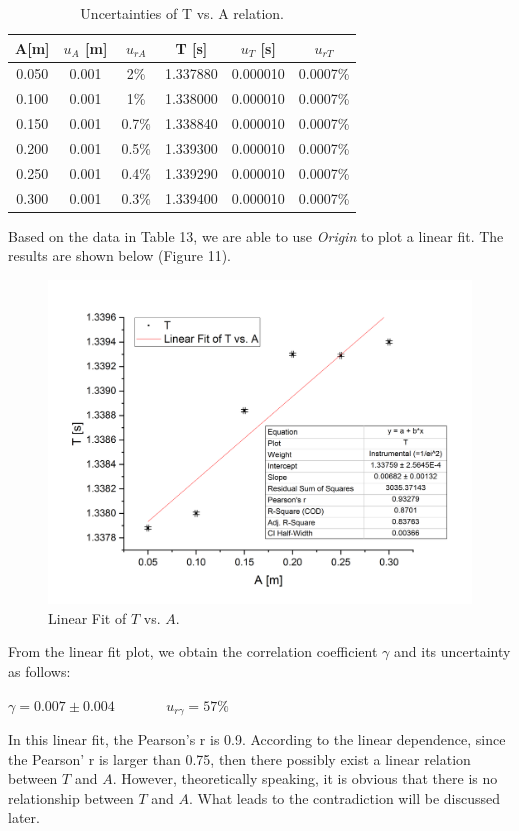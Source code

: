 \documentclass[a4paper,12pt]{article}
\begin{document}
\begin{table}[p]
\begin{center}
\begin{tabular}{|c|c|c||c|c|c|}
\hline
A[m] & $u_A$ [m] & $ u_{rA} $ & T [s] & $u_T$ [s] & $u_{rT}$ \\
\hline
0.050 & 0.001 & 2\% & 1.337880 & 0.000010 & 0.0007\%\\
0.100 & 0.001 & 1\% & 1.338000 & 0.000010 & 0.0007\%\\
0.150 & 0.001 & 0.7\% & 1.338840 & 0.000010 & 0.0007\%\\
0.200 & 0.001 & 0.5\% & 1.339300 & 0.000010 & 0.0007\%\\
0.250 & 0.001 & 0.4\% & 1.339290 & 0.000010 & 0.0007\%\\
0.300 & 0.001 & 0.3\% & 1.339400 & 0.000010 & 0.0007\%\\
\hline
\end{tabular}
\end{center}
\caption{Uncertainties of T vs. A relation.}
\end{table}
\par Based on the data in Table 13, we are able to use \textit{Origin} to plot a linear fit. The results are shown below (Figure 11).

\begin{figure}[p] 
    \centering
    \includegraphics[width=1\textwidth]{pic7} 
    \caption{Linear Fit of $T$ vs. $A$.} 
\end{figure}

\par From the linear fit plot, we obtain the correlation coefficient $\gamma$ and its uncertainty as follows:
\begin{center}
$ \gamma = 0.007 \pm 0.004 $ ~~~~~~ $u_{r\gamma} = 57\%$
\end{center}
\par In this linear fit, the Pearson's r is 0.9. According to the linear dependence, since the Pearson' r is larger than 0.75, then there possibly exist a linear relation between $T$ and $A$. However, theoretically speaking, it is obvious that there is no relationship between $T$ and $A$. What leads to the contradiction will be discussed later.
\end{document}
